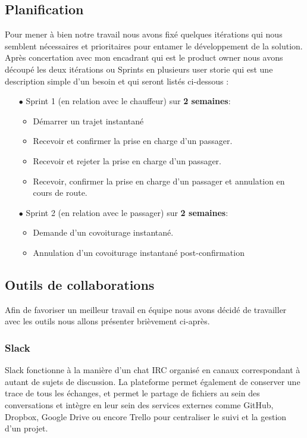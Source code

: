 \subsection{Planification} %
\label{sub:planification}
Pour mener à bien notre travail nous avons fixé quelques itérations qui nous semblent nécessaires et prioritaires pour entamer le développement de la solution. Après concertation avec mon encadrant qui est le product owner nous avons découpé les deux itérations ou Sprints en plusieurs user storie qui est une description simple d’un besoin et qui seront listés ci-dessous :
\begin{itemize}
	\item[$\bullet$] Sprint 1 (en relation avec le chauffeur) sur \textbf{2 semaines}:
		\begin{itemize}
			\item Démarrer un trajet instantané
			\item Recevoir et confirmer la prise en charge d’un passager.
			\item Recevoir et rejeter la prise en charge d’un passager.
			\item Recevoir, confirmer la prise en charge d’un passager et annulation en cours de route.
		\end{itemize}
	\item[$\bullet$] Sprint 2 (en relation avec le passager) sur \textbf{2 semaines}:
		\begin{itemize}
			\item Demande d’un covoiturage instantané.
			\item Annulation d’un covoiturage instantané post-confirmation
	\end{itemize}
\end{itemize}

\subsection{Outils de collaborations} %
\label{sub:outils_de_collaborations}

Afin de favoriser un meilleur travail en équipe nous avons décidé de travailler avec les outils nous allons présenter brièvement ci-après.
\subsubsection{Slack} %
\label{ssub:Slack}

Slack fonctionne à la manière d'un chat IRC organisé en canaux correspondant à autant de sujets de discussion. La plateforme permet également de conserver une trace de tous les échanges, et permet le partage de fichiers au sein des conversations et intègre en leur sein des services externes comme GitHub, Dropbox, Google Drive ou encore Trello pour centraliser le suivi et la gestion d'un projet. 

